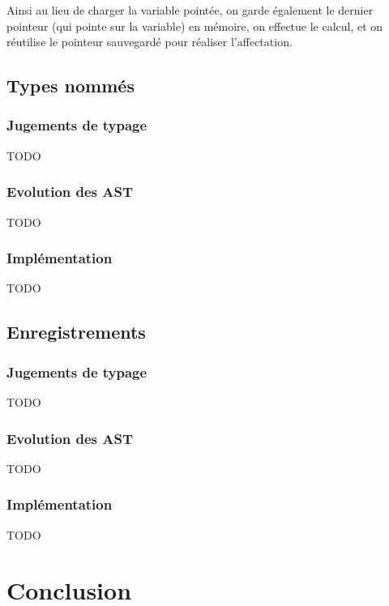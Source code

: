 \documentclass[headings=standardclasses,parskip=half]{scrartcl}
\begin{document}
Ainsi au lieu de charger la variable pointée,
on garde également le dernier pointeur (qui pointe sur la variable)
en mémoire, on effectue le calcul, et on réutilise
le pointeur sauvegardé pour réaliser l'affectation.

\subsection{Types nommés}

\subsubsection*{Jugements de typage}

TODO

\subsubsection*{Evolution des AST}

TODO

\subsubsection*{Implémentation}

TODO

\subsection{Enregistrements}

\subsubsection*{Jugements de typage}

TODO

\subsubsection*{Evolution des AST}

TODO

\subsubsection*{Implémentation}

TODO

\section{Conclusion}
\end{document}
